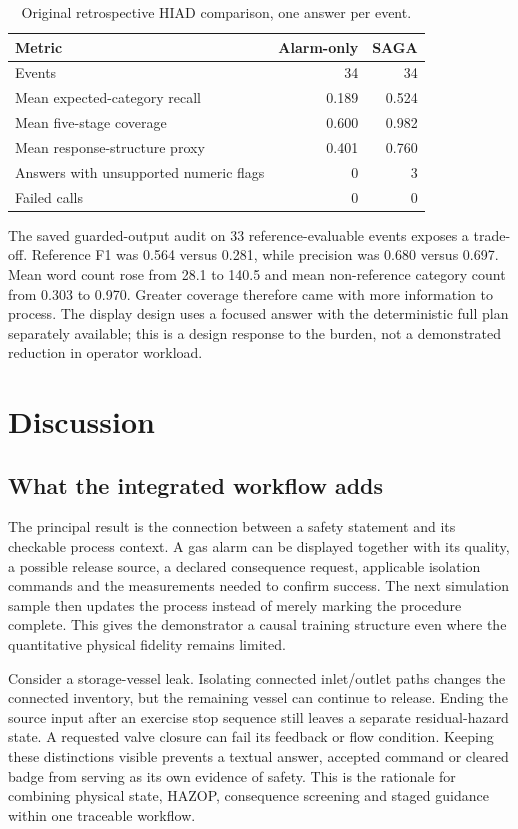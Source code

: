 \documentclass[12pt,a4paper]{article}
\begin{document}
\begin{table}[htbp]
\centering\small
\caption{Original retrospective HIAD comparison, one answer per event.}
\label{tab:saga-new}
\begin{tabular}{lrr}
\toprule
Metric & Alarm-only & SAGA \\
\midrule
Events & 34 & 34 \\
Mean expected-category recall & 0.189 & 0.524 \\
Mean five-stage coverage & 0.600 & 0.982 \\
Mean response-structure proxy & 0.401 & 0.760 \\
Answers with unsupported numeric flags & 0 & 3 \\
Failed calls & 0 & 0 \\
\bottomrule
\end{tabular}
\end{table}

The saved guarded-output audit on 33 reference-evaluable events exposes a
trade-off. Reference F1 was 0.564 versus 0.281, while precision was
0.680 versus 0.697. Mean word count rose from 28.1 to 140.5 and mean
non-reference category count from 0.303 to 0.970. Greater coverage therefore
came with more information to process. The display design uses a focused answer
with the deterministic full plan separately available; this is a design
response to the burden, not a demonstrated reduction in operator workload.

\section{Discussion}
\subsection{What the integrated workflow adds}
The principal result is the connection between a safety statement and its
checkable process context. A gas alarm can be displayed together with its
quality, a possible release source, a declared consequence request, applicable
isolation commands and the measurements needed to confirm success. The next
simulation sample then updates the process instead of merely marking the
procedure complete. This gives the demonstrator a causal training structure
even where the quantitative physical fidelity remains limited.

Consider a storage-vessel leak. Isolating connected inlet/outlet paths changes
the connected inventory, but the remaining vessel can continue to release.
Ending the source input after an exercise stop sequence still leaves a separate
residual-hazard state. A requested valve closure can fail its feedback or
flow condition. Keeping these distinctions visible prevents a textual answer,
accepted command or cleared badge from serving as its own evidence of safety.
This is the rationale for combining physical state, HAZOP, consequence screening
and staged guidance within one traceable workflow.
\end{document}
